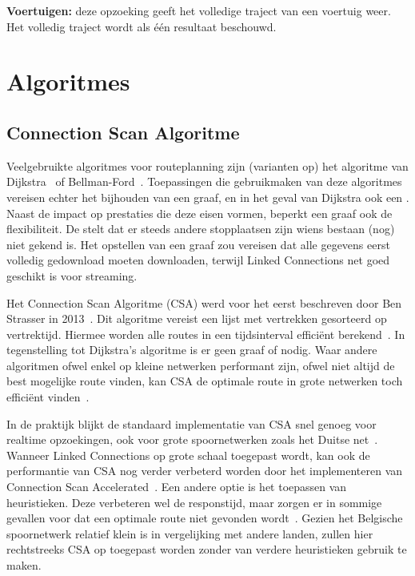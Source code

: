 \textbf{Voertuigen:} deze opzoeking geeft het volledige traject van een voertuig weer. Het volledig traject wordt als één resultaat beschouwd.

\section{Algoritmes}
\label{sec:algoritmes}
\subsection{Connection Scan Algoritme}
\label{sec:csa}
Veelgebruikte algoritmes voor routeplanning zijn (varianten op) het algoritme van Dijkstra~\citep{Dijkstra59, strasser13,hannemann07,hannemann08} of Bellman-Ford~\citep{Bellmanford58}. Toepassingen die gebruikmaken van deze algoritmes vereisen echter het bijhouden van een graaf, en in het geval van Dijkstra ook een . Naast de impact op prestaties die deze eisen vormen, beperkt een graaf ook de flexibiliteit. De  stelt dat er steeds andere stopplaatsen zijn wiens bestaan (nog) niet gekend is. Het opstellen van een graaf zou vereisen dat alle gegevens eerst volledig gedownload moeten downloaden, terwijl Linked Connections net goed geschikt is voor streaming. 

Het Connection Scan Algoritme (CSA) werd voor het eerst beschreven door Ben Strasser in 2013~\citep{strasser13}. Dit algoritme vereist een lijst met vertrekken gesorteerd op vertrektijd. Hiermee worden alle routes in een tijdsinterval efficiënt berekend~\citep{strasser14,strasser17}. In tegenstelling tot Dijkstra's algoritme is er geen graaf of  nodig. Waar andere algoritmen ofwel enkel op kleine netwerken performant zijn, ofwel niet altijd de best mogelijke route vinden, kan CSA de optimale route in grote netwerken toch efficiënt vinden~\citep{strasser14}.

In de praktijk blijkt de standaard implementatie van CSA snel genoeg voor realtime opzoekingen, ook voor grote spoornetwerken zoals het Duitse net~\citep{strasser14}. Wanneer Linked Connections op grote schaal toegepast wordt, kan ook de performantie van CSA nog verder verbeterd worden door het implementeren van Connection Scan Accelerated~\citep{strasser14,strasser17}. Een andere optie is het toepassen van heuristieken. Deze verbeteren wel de responstijd, maar zorgen er in sommige gevallen voor dat een optimale route niet gevonden wordt~\citep{hannemann07}. Gezien het Belgische spoornetwerk relatief klein is in vergelijking met andere landen, zullen hier rechtstreeks CSA op toegepast worden zonder van verdere heuristieken gebruik te maken. 

